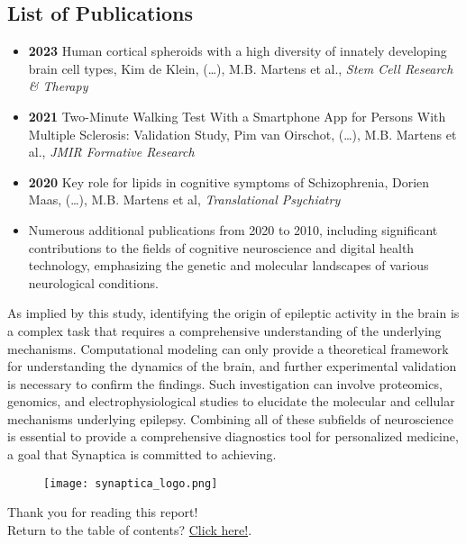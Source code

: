 \subsection*{List of Publications}
\begin{itemize}
    \item \textbf{2023} Human cortical spheroids with a high diversity of innately developing brain cell types, Kim de Klein, (\dots), M.B. Martens et al., \textit{Stem Cell Research \& Therapy}
    \item \textbf{2021} Two-Minute Walking Test With a Smartphone App for Persons With Multiple Sclerosis: Validation Study, Pim van Oirschot, (\dots), M.B. Martens et al., \textit{JMIR Formative Research}
    \item \textbf{2020} Key role for lipids in cognitive symptoms of Schizophrenia, Dorien Maas, (\dots), M.B. Martens et al, \textit{Translational Psychiatry}
    \item Numerous additional publications from 2020 to 2010, including significant contributions to the fields of cognitive neuroscience and digital health technology, emphasizing the genetic and molecular landscapes of various neurological conditions.
\end{itemize}

\noindent As implied by this study, identifying the origin of epileptic activity in the brain is a complex task that requires a comprehensive understanding of the underlying mechanisms.
Computational modeling can only provide a theoretical framework for understanding the dynamics of the brain, and further experimental validation is necessary to confirm the findings.
Such investigation can involve proteomics, genomics, and electrophysiological studies to elucidate the molecular and cellular mechanisms underlying epilepsy.
Combining all of these subfields of neuroscience is essential to provide a comprehensive diagnostics tool for personalized medicine, a goal that Synaptica is committed to achieving.
\vspace{12pt}
\begin{figure}[htbp]
    \centering
    \texttt{[image: synaptica\_logo.png]}
\end{figure}

\vfill
Thank you for reading this report!\\
Return to the table of contents? \hyperlink{toc}{Click here!}.
